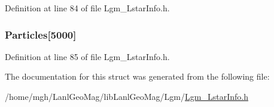 Definition at line 84 of file Lgm\_\-LstarInfo.h.\hypertarget{struct_lgm___lstar_info_5ff4824ef9c331c0e8a9683e62de9e98}{
\subsubsection[{Particles}]{ {\bf Particles}\mbox{[}5000\mbox{]}}}
\label{struct_lgm___lstar_info_5ff4824ef9c331c0e8a9683e62de9e98}




Definition at line 85 of file Lgm\_\-LstarInfo.h.

The documentation for this struct was generated from the following file:\begin{CompactItemize}
\item 
/home/mgh/LanlGeoMag/libLanlGeoMag/Lgm/\hyperlink{_lgm___lstar_info_8h}{Lgm\_\-LstarInfo.h}\end{CompactItemize}
